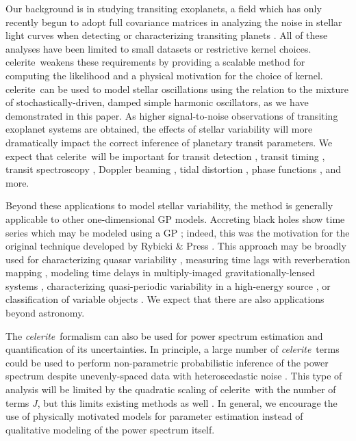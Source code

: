 \documentclass[manuscript, letterpaper]{aastex6}
\makeatletter
\let\origsubsection\subsection
\renewcommand\subsection{\@ifstar{\starsubsection}{\nostarsubsection}}
\newcommand\nostarsubsection[1]{\subsectionprelude\origsubsection{#1}}
\newcommand\starsubsection[1]{\subsectionprelude\origsubsection*{#1}}
\newcommand\subsectionprelude{\vspace{1em}}
\newcommand{\project}[1]{\textsf{#1}}
\newcommand{\celerite}{\project{celerite}}
\newcommand{\celeriteterm}{\emph{celerite}}
\makeatother
\begin{document}
Our background is in studying transiting exoplanets, a field which has only
recently begun to adopt full covariance matrices in analyzing the noise in
stellar light curves when detecting or characterizing transiting planets
\citep[for example,][]{Carter:2009, Gibson:2012, Barclay:2015, Evans:2015,
Aigrain:2016, Foreman-Mackey:2016b, Grunblatt:2016, Luger:2016}.
All of these analyses have been limited to small datasets or restrictive
kernel choices.
\celerite\ weakens these requirements by providing a scalable method for
computing the likelihood and a physical motivation for the choice of kernel.
\celerite\ can be used to model stellar oscillations using the relation to the
mixture of stochastically-driven, damped simple harmonic oscillators, as
we have demonstrated in this paper.
As higher signal-to-noise observations of transiting exoplanet systems are
obtained, the effects of stellar variability will more dramatically impact the
correct inference of planetary transit parameters.
We expect that \celerite\ will be important for transit detection
\citep{Pope:2016, Foreman-Mackey:2016b}, transit timing \citep{Agol:2005,
Holman:2005}, transit spectroscopy \citep{Brown:2001}, Doppler beaming
\citep{Loeb:2003, Zucker:2007}, tidal distortion \citep{Zucker:2007}, phase
functions \citep{Knutson:2007, Zucker:2007}, and more.

\subsection{Other applications and limitations}

Beyond these applications to model stellar variability, the method is
generally applicable to other one-dimensional GP models.
Accreting black holes show time series which may be modeled using a GP
\citep{Kelly:2014}; indeed, this was the motivation for the original technique
developed by Rybicki \& Press \citep{Rybicki:1992, Rybicki:1995}.
This approach may be broadly used for characterizing quasar variability
\citep{MacLeod:2010}, measuring time lags with reverberation mapping
\citep{Zu:2011, Pancoast:2014}, modeling time delays in multiply-imaged
gravitationally-lensed systems \citep{Press:1998}, characterizing
quasi-periodic variability in a high-energy source \citep{McAllister:2016}, or
classification of variable objects \citep{Zinn:2016}.
We expect that there are also applications beyond astronomy.

The \celeriteterm\ formalism can also be used for power spectrum estimation and
quantification of its uncertainties.
In principle, a large number of \celeriteterm\ terms could be used to perform
non-parametric probabilistic inference of the power spectrum despite
unevenly-spaced data with heteroscedastic noise \citep[for
example,][]{Wilson:2013, Kelly:2014}.
This type of analysis will be limited by the quadratic scaling of \celerite\
with the number of terms $J$, but this limits existing methods as well
\citep[CARMA models,][]{Kelly:2014}.
In general, we encourage the use of physically motivated models for parameter
estimation instead of qualitative modeling of the power spectrum itself.
\end{document}
